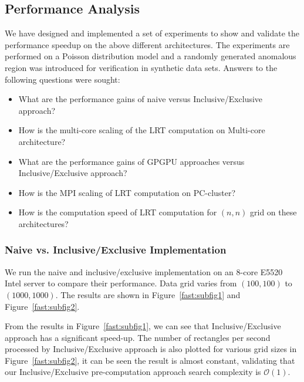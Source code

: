 \documentclass[10pt,journal,cspaper,compsoc]{IEEEtran}
\newcommand\bigo{\mathcal O}
\begin{document}
\subsection{Performance Analysis}
We have designed and implemented a set of experiments to show and validate the performance speedup on the above different architectures. The experiments are performed on a Poisson distribution model and a randomly generated anomalous region was introduced
for verification in synthetic data sets. Answers to the following questions were sought:
\begin{itemize}
\item What are the performance gains of naive versus Inclusive/Exclusive
 approach?
\item How is the multi-core scaling of the LRT computation on Multi-core architecture?
\item What are the performance gains of GPGPU approaches versus Inclusive/Exclusive approach?
\item How is the MPI scaling of LRT computation on PC-cluster?
\item How is the computation speed of LRT computation for $(n,n)$ grid on these architectures?
\end{itemize}

\subsubsection{Naive vs. Inclusive/Exclusive Implementation}
 We run the naive and inclusive/exclusive implementation on an 8-core E5520 Intel server to compare their performance. Data grid varies from $(100,100)$ to $(1000,1000)$. The results are shown in Figure~\ref{fast:subfig1} and Figure~\ref{fast:subfig2}.\\

From the results in Figure~\ref{fast:subfig1}, we can see that Inclusive/Exclusive approach has a significant speed-up. The number of rectangles per second processed by Inclusive/Exclusive approach is also plotted for various grid sizes in Figure~\ref{fast:subfig2}, it can be seen the result is almost constant, validating that our Inclusive/Exclusive pre-computation approach search complexity is $\bigo (1)$.
\end{document}
